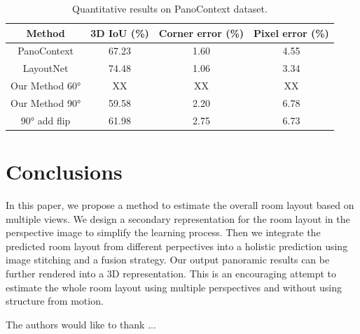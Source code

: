 \begin{table}
	\caption{Quantitative results on PanoContext dataset.}
	\label{tab:PC}
	\begin{tabular}{cccc}
		\toprule
		Method&3D IoU (\%)&Corner error (\%)&Pixel error (\%)\\
		\midrule
		PanoContext & 67.23 & 1.60 & 4.55\\
		LayoutNet & 74.48 & 1.06 & 3.34\\
		Our Method \ang{60} & XX & XX & XX\\	
		Our Method \ang{90} & 59.58 & 2.20 & 6.78\\	
		\ang{90} add flip & 61.98 & 2.75 & 6.73\\	
		\bottomrule
	\end{tabular}
\end{table}

\section{Conclusions}
In this paper, we propose a method to estimate the overall room layout based on multiple views. We design a secondary representation for the room layout in the perspective image to simplify the learning process. Then we integrate the predicted room layout from different perpectives into a holistic prediction using image stitching and a fusion strategy. Our output panoramic results can be further rendered into a 3D representation. This is an encouraging attempt to estimate the whole room layout using multiple perspectives and without using structure from motion.


\begin{acks}
  The authors would like to thank ...
\end{acks}
